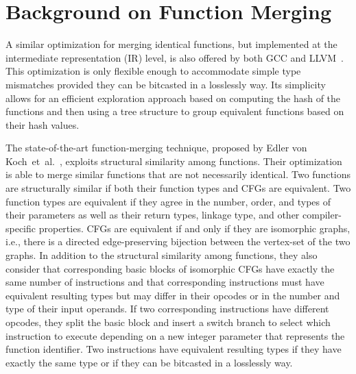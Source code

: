 \section{Background on Function Merging} \label{sec:background}


A similar optimization for merging identical functions, but implemented at the
intermediate representation (IR) level, is also offered by both GCC and
LLVM~\cite{llvm-fm,livska14}.
This optimization is only flexible enough to accommodate simple type mismatches
provided they can be bitcasted in a losslessly way.
Its simplicity allows for an efficient exploration approach based on computing
the hash of the functions and then using a tree structure to group equivalent
functions based on their hash values.

The state-of-the-art function-merging technique, proposed by Edler von
Koch~et~al.~\cite{edler14}, exploits structural similarity among functions.
Their optimization is able to merge similar functions that are not necessarily
identical.
Two functions are structurally similar if both their function types and
CFGs are equivalent.
Two function types are equivalent
if they agree in the number, order, and types of their parameters as well as
their return types, linkage type, and other compiler-specific properties.
CFGs are equivalent if and only if they are isomorphic graphs, i.e., there is a
directed edge-preserving bijection between the vertex-set of the two graphs.
In addition to the structural similarity among functions, they also consider
that corresponding basic blocks of isomorphic CFGs have exactly the same number
of instructions and that corresponding instructions must have equivalent
resulting types but may differ in their opcodes or in the number and type of
their input operands.
If two corresponding instructions have different opcodes, they split the basic
block and insert a switch branch to select which instruction to execute
depending on a new integer parameter that represents the function identifier.
Two instructions have equivalent resulting types if they have exactly
the same type or if they can be bitcasted in a losslessly way.

